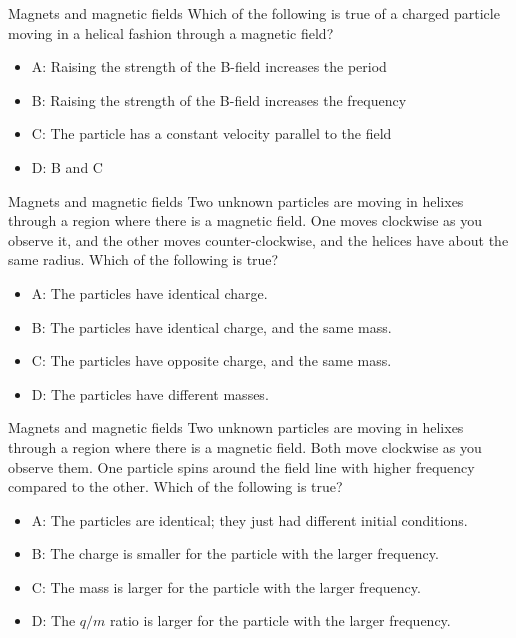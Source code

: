 \documentclass{beamer}
\begin{document}
\begin{frame}{Magnets and magnetic fields}
Which of the following is true of a charged particle moving in a helical fashion through a magnetic field?
\begin{itemize}
\item A: Raising the strength of the B-field increases the period
\item B: Raising the strength of the B-field increases the frequency
\item C: The particle has a constant velocity parallel to the field
\item D: B and C
\end{itemize}
\end{frame}

\begin{frame}{Magnets and magnetic fields}
Two unknown particles are moving in helixes through a region where there is a magnetic field.  One moves clockwise as you observe it, and the other moves counter-clockwise, and the helices have about the same radius.  Which of the following is true?
\begin{itemize}
\item A: The particles have identical charge.
\item B: The particles have identical charge, and the same mass.
\item C: The particles have opposite charge, and the same mass.
\item D: The particles have different masses.
\end{itemize}
\end{frame}

\begin{frame}{Magnets and magnetic fields}
Two unknown particles are moving in helixes through a region where there is a magnetic field.  Both move clockwise as you observe them. One particle spins around the field line with higher frequency compared to the other.  Which of the following is true?
\begin{itemize}
\item A: The particles are identical; they just had different initial conditions.
\item B: The charge is smaller for the particle with the larger frequency.
\item C: The mass is larger for the particle with the larger frequency.
\item D: The $q/m$ ratio is larger for the particle with the larger frequency.
\end{itemize}
\end{frame}
\end{document}
